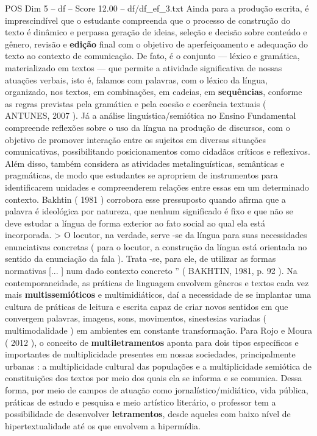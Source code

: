 \begin{textsample}{POS Dim 5 – df – Score 12.00 – df/df\_ef\_3.txt}
Ainda para a produção escrita, é imprescindível que o estudante compreenda que o processo de construção do texto é dinâmico e perpassa geração de ideias, seleção e decisão sobre conteúdo e gênero, revisão e \textbf{edição} final com o objetivo de aperfeiçoamento e adequação do texto ao contexto de comunicação.
De fato, é o conjunto — léxico e gramática, materializado em textos — que permite a atividade significativa de nossas atuações verbais, isto é, falamos com palavras, com o léxico da língua, organizado, nos textos, em combinações, em cadeias, em \textbf{sequências}, conforme as regras previstas pela gramática e pela coesão e coerência textuais ( ANTUNES, 2007 ).
Já a análise linguística/semiótica no Ensino Fundamental compreende reflexões sobre o uso da língua na produção de discursos, com o objetivo de promover interação entre os sujeitos em diversas situações comunicativas, possibilitando posicionamentos como cidadãos críticos e reflexivos.
Além disso, também considera as atividades metalinguísticas, semânticas e pragmáticas, de modo que estudantes se apropriem de instrumentos para identificarem unidades e compreenderem relações entre essas em um determinado contexto.
Bakhtin ( 1981 ) corrobora esse pressuposto quando afirma que a palavra é ideológica por natureza, que nenhum significado é fixo e que não se deve estudar a língua de forma exterior ao fato social ao qual ela está incorporada. > O locutor, na verdade, serve -se da língua para suas necessidades enunciativas concretas ( para o locutor, a construção da língua está orientada no sentido da enunciação da fala ).
Trata -se, para ele, de utilizar as formas normativas [... ] num dado contexto concreto ” ( BAKHTIN, 1981, p. 92 ).
Na contemporaneidade, as práticas de linguagem envolvem gêneros e textos cada vez mais \textbf{multissemióticos} e multimidiáticos, daí a necessidade de se implantar uma cultura de práticas de leitura e escrita capaz de criar novos sentidos em que convergem palavras, imagens, sons, movimentos, sinestesias variadas ( multimodalidade ) em ambientes em constante transformação.
Para Rojo e Moura ( 2012 ), o conceito de \textbf{multiletramentos} aponta para dois tipos específicos e importantes de multiplicidade presentes em nossas sociedades, principalmente urbanas : a multiplicidade cultural das populações e a multiplicidade semiótica de constituições dos textos por meio dos quais ela se informa e se comunica.
Dessa forma, por meio de campos de atuação como jornalístico/midiático, vida pública, práticas de estudo e pesquisa e meio artístico literário, o professor tem a possibilidade de desenvolver \textbf{letramentos}, desde aqueles com baixo nível de hipertextualidade até os que envolvem a hipermídia.

\end{textsample}
